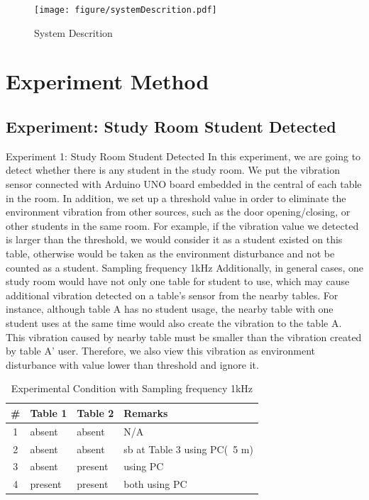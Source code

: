 \documentclass{sig-alternate-ipsn13}
\newcommand\tabhead[1]{\small\textbf{#1}}
\begin{document}
\begin{figure}
  \centering
  \texttt{[image: figure/systemDescrition.pdf]}
  \caption{System Descrition}
  \label{fig:SystemDescrition}
\end{figure}



\section{Experiment Method}
\subsection{Experiment: Study Room Student Detected}
Experiment 1: Study Room Student Detected
In this experiment, we are going to detect whether there is any student in the study room. We put the vibration sensor connected with Arduino UNO board embedded in the central of each table in the room. In addition, we set up a threshold value in order to eliminate the environment vibration from other sources, such as the door opening/closing, or other students in the same room. For example, if the vibration value we detected is larger than the threshold, we would consider it as a student existed on this table, otherwise would be taken as the environment disturbance and not be counted as a student. 
Sampling frequency 1kHz
Additionally, in general cases, one study room would have not only one table for student to use, which may cause additional vibration detected on a table's sensor from the nearby tables. For instance, although table A has no student usage, the nearby table with one student uses at the same time would also create the vibration to the table A. This vibration caused by nearby table must be smaller than the vibration created by table A' user. Therefore, we also view this vibration as environment disturbance with value lower than threshold and ignore it.


\begin{table}
    \centering
    \begin{tabular}{|c|l|l|l|}
      \hline
      \tabhead{\#} &
      \multicolumn{1}{|p{0.1\columnwidth}|}{\centering\tabhead{Table 1}} &
      \multicolumn{1}{|p{0.1\columnwidth}|}{\centering\tabhead{Table 2}} &
      \multicolumn{1}{|p{0.45\columnwidth}|}{\centering\tabhead{Remarks}} \\
      \hline
      1 & absent & absent & N/A \\
      \hline
      2 & absent & absent & sb at Table 3 using PC(~5 m)\\
      \hline
      3 & absent & present & using PC\\
      \hline
      4 & present & present & both using PC\\
      \hline
      
    \end{tabular}
    \caption{Experimental Condition with Sampling frequency 1kHz}
    \label{tab:table1}
  \end{table}
\end{document}
